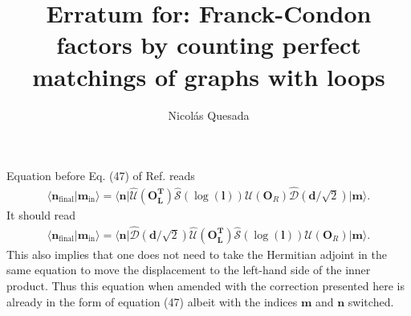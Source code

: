 \documentclass[twocolumn,pra]{revtex4}
\newcommand{\ket}[1]{| #1 \rangle}
\newcommand{\bra}[1]{\langle #1 |}
\newcommand{\braket}[1]{\langle #1 \rangle}
\newcommand{\eq}[1]{\begin{align}#1\end{align}}
\begin{document}
\title{Erratum for: Franck-Condon factors by counting perfect matchings of graphs with loops
}
\author{Nicol\'as Quesada}

\maketitle
Equation before Eq. (47) of Ref. \cite{quesada2019franck} reads
\eq{
\braket{\bm{n}_{\text{final}}|\bm{m}_{\text{in}}} = \bra{\bm{n}} \mathcal{\hat U}(\bm{O_L^T}) \mathcal{\hat S}(\log(\bm{l})) \mathcal{U}(\bm{O}_R) \mathcal{\hat D}(\bm{d}/\sqrt{2}) \ket{\bm{m}}.
}
It should read
\eq{
\braket{\bm{n}_{\text{final}}|\bm{m}_{\text{in}}} = \bra{\bm{n}}  \mathcal{\hat D}(\bm{d}/\sqrt{2})  \mathcal{\hat U}(\bm{O_L^T}) \mathcal{\hat S}(\log(\bm{l})) \mathcal{U}(\bm{O}_R) \ket{\bm{m}}.
}
This also implies that one does not need to take the Hermitian adjoint in the same equation to move the displacement to the left-hand side of the inner product.
Thus this equation when amended with the correction presented here is already in the form of equation (47) albeit with the indices $\bm{m}$ and $\bm{n}$ switched.



\end{document}
